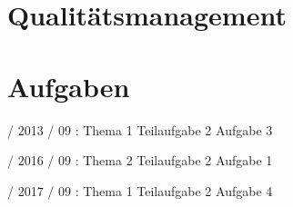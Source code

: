 \documentclass{lehramt-informatik}
\begin{document}

\chapter{Qualitätsmanagement}


\chapter{Aufgaben}

 / 2013 / 09 : Thema 1 Teilaufgabe 2 Aufgabe 3

%

 / 2016 / 09 : Thema 2 Teilaufgabe 2 Aufgabe 1

%

 / 2017 / 09 : Thema 1 Teilaufgabe 2 Aufgabe 4

\literatur
\end{document}
